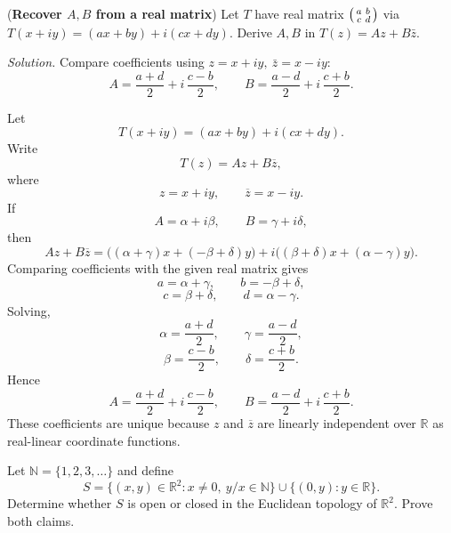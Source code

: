 \begin{problem}[CP-IV-0055]
\label{prob:cp-iv-0055}
\par\noindent\textbullet\quad (\textbf{Recover $A,B$ from a real matrix})
	Let $T$ have real matrix $\begin{psmallmatrix}a&b\\ c&d\end{psmallmatrix}$ via
	$T(x+iy)=(ax+by)+i(cx+dy)$. Derive $A,B$ in $T(z)=Az+B\bar z$.

	\emph{Solution.} Compare coefficients using $z=x+iy,\ \bar z=x-iy$:
	\[
	A=\frac{a+d}{2}+i\,\frac{c-b}{2},\qquad
	B=\frac{a-d}{2}+i\,\frac{c+b}{2}.
	\]
\end{problem}

\begin{solution}
Let
\[
T(x+iy)=(ax+by)+i(cx+dy).
\]
Write
\[
T(z)=Az+B\overline z,
\]
where
\[
z=x+iy,\qquad \overline z=x-iy.
\]
If
\[
A=\alpha+i\beta,
\qquad
B=\gamma+i\delta,
\]
then
\[
Az+B\overline z
=
\bigl((\alpha+\gamma)x+(-\beta+\delta)y\bigr)
+
i\bigl((\beta+\delta)x+(\alpha-\gamma)y\bigr).
\]
Comparing coefficients with the given real matrix gives
\[
a=\alpha+\gamma,\qquad
b=-\beta+\delta,
\]
\[
c=\beta+\delta,\qquad
d=\alpha-\gamma.
\]
Solving,
\[
\alpha=\frac{a+d}{2},
\qquad
\gamma=\frac{a-d}{2},
\]
\[
\beta=\frac{c-b}{2},
\qquad
\delta=\frac{c+b}{2}.
\]
Hence
\[
\boxed{
A=\frac{a+d}{2}+i\,\frac{c-b}{2},
\qquad
B=\frac{a-d}{2}+i\,\frac{c+b}{2}.
}
\]
These coefficients are unique because \(z\) and \(\overline z\) are linearly independent over \(\mathbb R\) as real-linear coordinate functions.
\end{solution}


\begin{problem}[CP-IV-0056]
\label{prob:cp-iv-0056}
Let $\mathbb N=\{1,2,3,\ldots\}$ and define
\[
S=\bigl\{(x,y)\in\mathbb R^2:x\ne0,\ y/x\in\mathbb N\bigr\}
  \cup\bigl\{(0,y):y\in\mathbb R\bigr\}.
\]
Determine whether $S$ is open or closed in the Euclidean topology of
$\mathbb R^2$. Prove both claims.
\end{problem}

